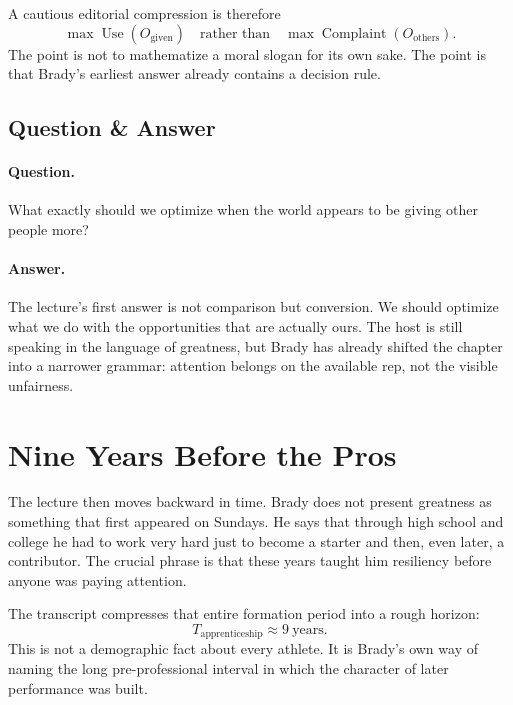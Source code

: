A cautious editorial compression is therefore
\begin{equation}
\max \operatorname{Use}(O_{\text{given}})
\quad \text{rather than} \quad
\max \operatorname{Complaint}(O_{\text{others}}).
\end{equation}
The point is not to mathematize a moral slogan for its own sake. The point is that Brady's earliest answer already contains a decision rule.

\subsection{Question \& Answer}

\paragraph{Question.} What exactly should we optimize when the world appears to be giving other people more?

\paragraph{Answer.} The lecture's first answer is not comparison but conversion. We should optimize what we do with the opportunities that are actually ours. The host is still speaking in the language of greatness, but Brady has already shifted the chapter into a narrower grammar: attention belongs on the available rep, not the visible unfairness.

\section{Nine Years Before the Pros}

The lecture then moves backward in time. Brady does not present greatness as something that first appeared on Sundays. He says that through high school and college he had to work very hard just to become a starter and then, even later, a contributor. The crucial phrase is that these years taught him resiliency before anyone was paying attention.

The transcript compresses that entire formation period into a rough horizon:
\begin{equation}
T_{\text{apprenticeship}} \approx 9 \ \text{years}.
\end{equation}
This is not a demographic fact about every athlete. It is Brady's own way of naming the long pre-professional interval in which the character of later performance was built.

